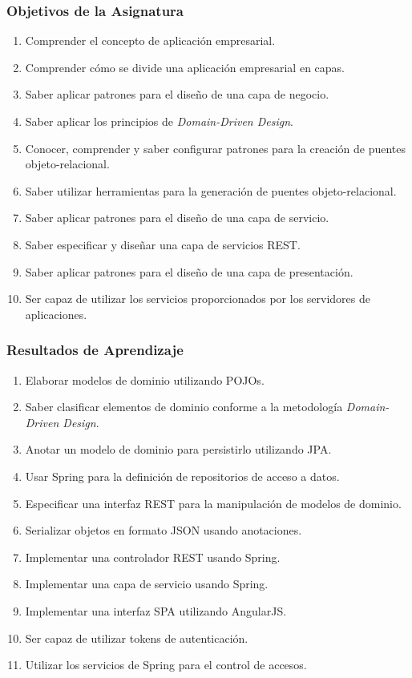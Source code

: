 \documentclass[a4paper,t,xcolor=pst,dvips,colortheme]{beamer}
\begin{document}
\begin{frame}[c]
   \frametitle{Objetivos de la Asignatura}
   \begin{enumerate}[<+->]
        \item Comprender el concepto de aplicación empresarial.
        \item Comprender cómo se divide una aplicación empresarial en capas.
        \item Saber aplicar patrones para el diseño de una capa de negocio.
        \item Saber aplicar los principios de \emph{Domain-Driven Design}.
        \item Conocer, comprender y saber configurar patrones para la creación de puentes objeto-relacional.
        \item Saber utilizar herramientas para la generación de puentes objeto-relacional.
        \item Saber aplicar patrones para el diseño de una capa de servicio.
        \item Saber especificar y diseñar una capa de servicios REST.
        \item Saber aplicar patrones para el diseño de una capa de presentación.
        \item Ser capaz de utilizar los servicios proporcionados por los servidores de aplicaciones.
	\end{enumerate}
\end{frame}

\begin{frame}[c]
   \frametitle{Resultados de Aprendizaje}
   \begin{enumerate}[<+->]
        \item Elaborar modelos de dominio utilizando POJOs.
        \item Saber clasificar elementos de dominio conforme a la metodología \emph{Domain-Driven Design}.
        \item Anotar un modelo de dominio para persistirlo utilizando JPA.
        \item Usar Spring para la definición de repositorios de acceso a datos.
        \item Especificar una interfaz REST para la manipulación de modelos de dominio.
        \item Serializar objetos en formato JSON usando anotaciones.
        \item Implementar una controlador REST usando Spring.
        \item Implementar una capa de servicio usando Spring.
        \item Implementar una interfaz SPA utilizando AngularJS.
        \item Ser capaz de utilizar tokens de autenticación.
        \item Utilizar los servicios de Spring para el control de accesos.
	\end{enumerate}
\end{frame}
\end{document}
